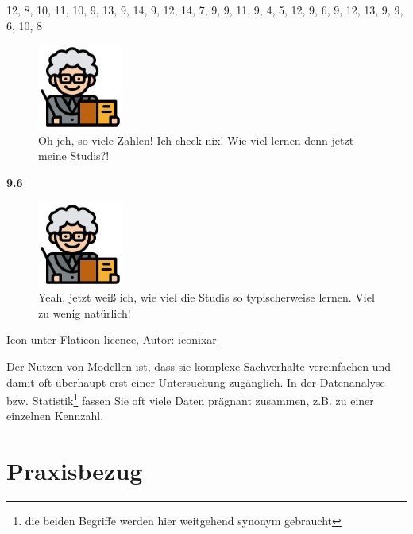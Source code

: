 \documentclass[
  a4paper,
  DIV=11]{scrreprt}
\theoremstyle{definition}
\theoremstyle{definition}
\theoremstyle{remark}
\begin{document}
12, 8, 10, 11, 10, 9, 13, 9, 14, 9, 12, 14, 7, 9, 9, 11, 9, 4, 5, 12, 9,
6, 9, 12, 13, 9, 9, 6, 10, 8

\begin{figure}

{\centering \includegraphics[width=0.25\textwidth,height=\textheight]{./img/teacher.png}

}

\caption{Oh jeh, so viele Zahlen! Ich check nix! Wie viel lernen denn
jetzt meine Studis?!}

\end{figure}

\textbf{9.6}

\begin{figure}

{\centering \includegraphics[width=0.25\textwidth,height=\textheight]{./img/teacher.png}

}

\caption{Yeah, jetzt weiß ich, wie viel die Studis so typischerweise
lernen. Viel zu wenig natürlich!}

\end{figure}

\href{https://www.flaticon.com/free-icons/professor}{Icon unter Flaticon
licence, Autor: iconixar}

Der Nutzen von Modellen ist, dass sie komplexe Sachverhalte vereinfachen
und damit oft überhaupt erst einer Untersuchung zugänglich. In der
Datenanalyse bzw. Statistik\footnote{die beiden Begriffe werden hier
  weitgehend synonym gebraucht} fassen Sie oft viele Daten prägnant
zusammen, z.B. zu einer einzelnen Kennzahl.

\hypertarget{praxisbezug}{%
\section{Praxisbezug}\label{praxisbezug}}
\end{document}
